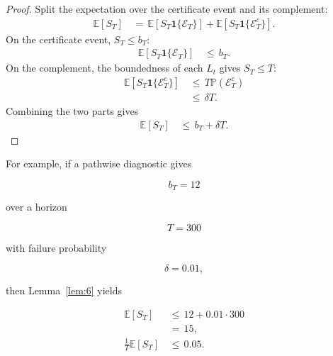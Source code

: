 \documentclass{article} %
\begin{document}
\begin{proof}
Split the expectation over the certificate event and its complement:
\begin{align}
\label{eq:app-fifth-cert-proof-split}
\mathbb{E}[S_T]
&\,=\,
\mathbb{E}[S_T\mathbf{1}\{\mathcal{E}_T\}]
+
\mathbb{E}[S_T\mathbf{1}\{\mathcal{E}_T^{c}\}].
\end{align}
On the certificate event, \(S_T\le b_T\):
\begin{align}
\label{eq:app-fifth-cert-proof-good}
\mathbb{E}[S_T\mathbf{1}\{\mathcal{E}_T\}]
&\,\le\,
b_T.
\end{align}
On the complement, the boundedness of each \(L_t\) gives \(S_T\le T\):
\begin{align}
\label{eq:app-fifth-cert-proof-bad}
\mathbb{E}[S_T\mathbf{1}\{\mathcal{E}_T^{c}\}]
&\,\le\,
T\mathbb{P}(\mathcal{E}_T^{c})
\\
&\,\le\,
\delta T.
\end{align}
Combining the two parts gives
\begin{align}
\label{eq:app-fifth-cert-proof-final}
\mathbb{E}[S_T]
&\,\le\,
b_T+\delta T.
\end{align}
\end{proof}

For example, if a pathwise diagnostic gives

\begin{equation}
\label{eq:app-fifth-cert-example-b}
b_T=12
\end{equation}

over a horizon

\begin{equation}
\label{eq:app-fifth-cert-example-T}
T=300
\end{equation}

with failure probability

\begin{equation}
\label{eq:app-fifth-cert-example-delta}
\delta=0.01,
\end{equation}

then Lemma~\ref{lem:6} yields

\begin{align}
\label{eq:app-fifth-cert-example}
\mathbb{E}[S_T]
&\,\le\,
12+0.01\cdot 300
\\
&\,=\,
15,
\\
\frac{1}{T}\mathbb{E}[S_T]
&\,\le\,
0.05.
\end{align}
\end{document}
